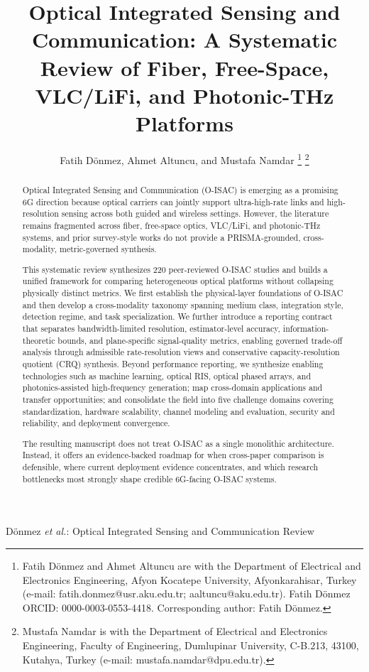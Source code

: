\documentclass[lettersize,journal]{IEEEtran}
\begin{document}
\title{Optical Integrated Sensing and Communication: A Systematic Review of Fiber, Free-Space, VLC/LiFi, and Photonic-THz Platforms}

\author{Fatih D\"onmez, Ahmet Altuncu, and Mustafa Namdar%
\thanks{Fatih D\"onmez and Ahmet Altuncu are with the Department of Electrical and Electronics Engineering, Afyon Kocatepe University, Afyonkarahisar, Turkey (e-mail: fatih.donmez@usr.aku.edu.tr; aaltuncu@aku.edu.tr). Fatih D\"onmez ORCID: 0000-0003-0553-4418. Corresponding author: Fatih D\"onmez.}%
\thanks{Mustafa Namdar is with the Department of Electrical and Electronics Engineering, Faculty of Engineering, Dumlupinar University, C-B.213, 43100, Kutahya, Turkey (e-mail: mustafa.namdar@dpu.edu.tr).}}

%
{D\"onmez \MakeLowercase{\textit{et al.}}: Optical Integrated Sensing and Communication Review}

\maketitle

\begin{abstract}
Optical Integrated Sensing and Communication (O-ISAC) is emerging as a promising 6G direction because optical carriers can jointly support ultra-high-rate links and high-resolution sensing across both guided and wireless settings. However, the literature remains fragmented across fiber, free-space optics, VLC/LiFi, and photonic-THz systems, and prior survey-style works do not provide a PRISMA-grounded, cross-modality, metric-governed synthesis.

This systematic review synthesizes 220 peer-reviewed O-ISAC studies and builds a unified framework for comparing heterogeneous optical platforms without collapsing physically distinct metrics. We first establish the physical-layer foundations of O-ISAC and then develop a cross-modality taxonomy spanning medium class, integration style, detection regime, and task specialization. We further introduce a reporting contract that separates bandwidth-limited resolution, estimator-level accuracy, information-theoretic bounds, and plane-specific signal-quality metrics, enabling governed trade-off analysis through admissible rate-resolution views and conservative capacity-resolution quotient (CRQ) synthesis. Beyond performance reporting, we synthesize enabling technologies such as machine learning, optical RIS, optical phased arrays, and photonics-assisted high-frequency generation; map cross-domain applications and transfer opportunities; and consolidate the field into five challenge domains covering standardization, hardware scalability, channel modeling and evaluation, security and reliability, and deployment convergence.

The resulting manuscript does not treat O-ISAC as a single monolithic architecture. Instead, it offers an evidence-backed roadmap for when cross-paper comparison is defensible, where current deployment evidence concentrates, and which research bottlenecks most strongly shape credible 6G-facing O-ISAC systems.
\end{abstract}
\end{document}
